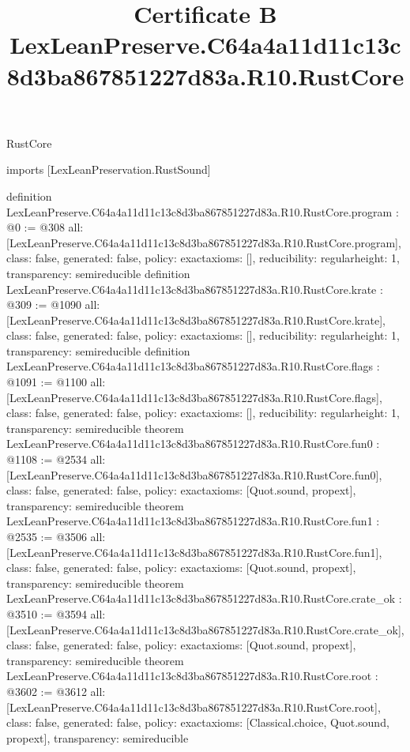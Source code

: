 \begin{lexlean}{RustCore}
\title{Certificate B LexLeanPreserve.C64a4a11d11c13c8d3ba867851227d83a.R10.RustCore}
\begin{coremodule}
imports [LexLeanPreservation.RustSound]

definition LexLeanPreserve.C64a4a11d11c13c8d3ba867851227d83a.R10.RustCore.program : @0 := @308 {
  all: [LexLeanPreserve.C64a4a11d11c13c8d3ba867851227d83a.R10.RustCore.program],
  class: false,
  generated: false,
  policy: exact{axioms: []},
  reducibility: regular{height: 1},
  transparency: semireducible
}
definition LexLeanPreserve.C64a4a11d11c13c8d3ba867851227d83a.R10.RustCore.krate : @309 := @1090 {
  all: [LexLeanPreserve.C64a4a11d11c13c8d3ba867851227d83a.R10.RustCore.krate],
  class: false,
  generated: false,
  policy: exact{axioms: []},
  reducibility: regular{height: 1},
  transparency: semireducible
}
definition LexLeanPreserve.C64a4a11d11c13c8d3ba867851227d83a.R10.RustCore.flags : @1091 := @1100 {
  all: [LexLeanPreserve.C64a4a11d11c13c8d3ba867851227d83a.R10.RustCore.flags],
  class: false,
  generated: false,
  policy: exact{axioms: []},
  reducibility: regular{height: 1},
  transparency: semireducible
}
theorem LexLeanPreserve.C64a4a11d11c13c8d3ba867851227d83a.R10.RustCore.fun0 : @1108 := @2534 {
  all: [LexLeanPreserve.C64a4a11d11c13c8d3ba867851227d83a.R10.RustCore.fun0],
  class: false,
  generated: false,
  policy: exact{axioms: [Quot.sound, propext]},
  transparency: semireducible
}
theorem LexLeanPreserve.C64a4a11d11c13c8d3ba867851227d83a.R10.RustCore.fun1 : @2535 := @3506 {
  all: [LexLeanPreserve.C64a4a11d11c13c8d3ba867851227d83a.R10.RustCore.fun1],
  class: false,
  generated: false,
  policy: exact{axioms: [Quot.sound, propext]},
  transparency: semireducible
}
theorem LexLeanPreserve.C64a4a11d11c13c8d3ba867851227d83a.R10.RustCore.crate_ok : @3510 := @3594 {
  all: [LexLeanPreserve.C64a4a11d11c13c8d3ba867851227d83a.R10.RustCore.crate_ok],
  class: false,
  generated: false,
  policy: exact{axioms: [Quot.sound, propext]},
  transparency: semireducible
}
theorem LexLeanPreserve.C64a4a11d11c13c8d3ba867851227d83a.R10.RustCore.root : @3602 := @3612 {
  all: [LexLeanPreserve.C64a4a11d11c13c8d3ba867851227d83a.R10.RustCore.root],
  class: false,
  generated: false,
  policy: exact{axioms: [Classical.choice, Quot.sound, propext]},
  transparency: semireducible
}


\end{coremodule}
\end{lexlean}
